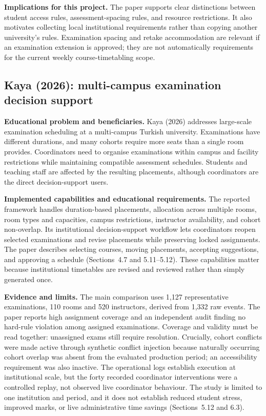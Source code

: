 \documentclass[
  11pt,a4paper,oneside]{report}
\begin{document}
\textbf{Implications for this project.} The paper supports clear distinctions between student access rules, assessment-spacing rules, and resource restrictions. It also motivates collecting local institutional requirements rather than copying another university's rules. Examination spacing and retake accommodation are relevant if an examination extension is approved; they are not automatically requirements for the current weekly course-timetabling scope.

\subsection{Kaya (2026): multi-campus examination decision support}
\textbf{Educational problem and beneficiaries.} Kaya (2026) addresses large-scale examination scheduling at a multi-campus Turkish university. Examinations have different durations, and many cohorts require more seats than a single room provides. Coordinators need to organise examinations within campus and facility restrictions while maintaining compatible assessment schedules. Students and teaching staff are affected by the resulting placements, although coordinators are the direct decision-support users.

\textbf{Implemented capabilities and educational requirements.} The reported framework handles duration-based placements, allocation across multiple rooms, room types and capacities, campus restrictions, instructor availability, and cohort non-overlap. Its institutional decision-support workflow lets coordinators reopen selected examinations and revise placements while preserving locked assignments. The paper describes selecting courses, moving placements, accepting suggestions, and approving a schedule (Sections~4.7 and 5.11--5.12). These capabilities matter because institutional timetables are revised and reviewed rather than simply generated once.

\textbf{Evidence and limits.} The main comparison uses 1,127 representative examinations, 110 rooms and 520 instructors, derived from 1,332 raw events. The paper reports high assignment coverage and an independent audit finding no hard-rule violation among assigned examinations. Coverage and validity must be read together: unassigned exams still require resolution. Crucially, cohort conflicts were made active through synthetic conflict injection because naturally occurring cohort overlap was absent from the evaluated production period; an accessibility requirement was also inactive. The operational logs establish execution at institutional scale, but the forty recorded coordinator interventions were a controlled replay, not observed live coordinator behaviour. The study is limited to one institution and period, and it does not establish reduced student stress, improved marks, or live administrative time savings (Sections~5.12 and 6.3).
\end{document}

